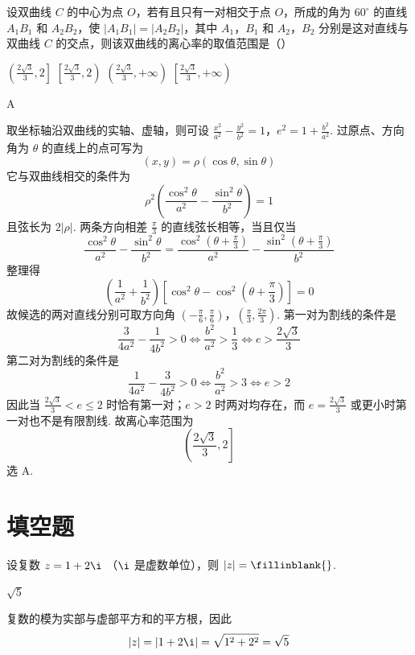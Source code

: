 \begin{problem}
设双曲线 \(C\) 的中心为点 \(O\)，若有且只有一对相交于点 \(O\)，所成的角为 \(60^{\circ}\) 的直线 \(A_{1}B_{1}\) 和 \(A_{2}B_{2}\)，使 \(|A_{1}B_{1}| = |A_{2}B_{2}|\)，其中 \(A_{1}\)，\(B_{1}\) 和 \(A_{2}\)，\(B_{2}\) 分别是这对直线与双曲线 \(C\) 的交点，则该双曲线的离心率的取值范围是（\quad）

\choices
    {\(\left(\frac{2\sqrt{3}}{3},2\right]\)}
    {\(\left[\frac{2\sqrt{3}}{3},2\right)\)}
    {\(\left(\frac{2\sqrt{3}}{3},+\infty\right)\)}
    {\(\left[\frac{2\sqrt{3}}{3},+\infty\right)\)}
\begin{answer}
A
\end{answer}
\begin{solution}
取坐标轴沿双曲线的实轴、虚轴，则可设
\(\frac{x^2}{a^2}-\frac{y^2}{b^2}=1\)，\(e^2=1+\frac{b^2}{a^2}\).
过原点、方向角为 \(\theta\) 的直线上的点可写为
\[
(x,y)=\rho(\cos\theta,\sin\theta)
\]
它与双曲线相交的条件为
\[
\rho^2\left(\frac{\cos^2\theta}{a^2}-\frac{\sin^2\theta}{b^2}\right)=1
\]
且弦长为 \(2|\rho|\). 两条方向相差 \(\frac\pi3\) 的直线弦长相等，当且仅当
\[
\frac{\cos^2\theta}{a^2}-\frac{\sin^2\theta}{b^2}
=\frac{\cos^2(\theta+\frac\pi3)}{a^2}-\frac{\sin^2(\theta+\frac\pi3)}{b^2}
\]
整理得
\[
\left(\frac1{a^2}+\frac1{b^2}\right)
\left[\cos^2\theta-\cos^2\left(\theta+\frac\pi3\right)\right]=0
\]
故候选的两对直线分别可取方向角
\(\left(-\frac\pi6,\frac\pi6\right)\)，\(\left(\frac\pi3,\frac{2\pi}3\right)\).
第一对为割线的条件是
\[
\frac{3}{4a^2}-\frac{1}{4b^2}>0
\iff \frac{b^2}{a^2}>\frac13
\iff e>\frac{2\sqrt3}{3}
\]
第二对为割线的条件是
\[
\frac{1}{4a^2}-\frac{3}{4b^2}>0
\iff \frac{b^2}{a^2}>3
\iff e>2
\]
因此当 \(\frac{2\sqrt3}{3}<e\leqslant2\) 时恰有第一对；\(e>2\) 时两对均存在，而 \(e=\frac{2\sqrt3}{3}\) 或更小时第一对也不是有限割线. 故离心率范围为
\[
\left(\frac{2\sqrt3}{3},2\right]
\]
选 A.
\end{solution}
\end{problem}

\section{填空题}

\begin{problem}
设复数 \(z = 1 + 2\i\) （\(\i\) 是虚数单位），则 \(|z| =\fillinblank{}\).
\begin{answer}
\(\sqrt{5}\)
\end{answer}
\begin{solution}
复数的模为实部与虚部平方和的平方根，因此
\[
|z|=|1+2\i|=\sqrt{1^2+2^2}=\sqrt5
\]
\end{solution}
\end{problem}

